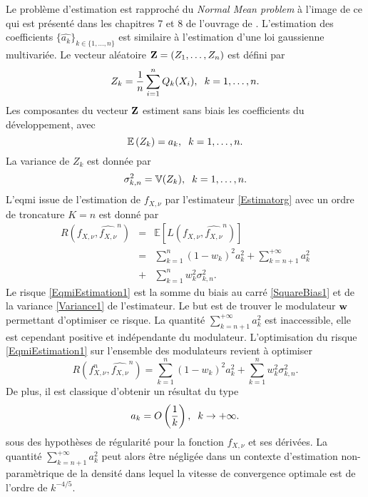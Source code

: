 Le problème d'estimation est rapproché du \textit{Normal Mean problem} à l'image de ce qui est présenté dans les chapitres 7 et 8 de l'ouvrage de \citet{Wa06}. L'estimation des coefficients $\{\widehat{a_{k}}\}_{k\in\{1,\ldots,n\}}$ est similaire à l'estimation d'une loi gaussienne multivariée. Le vecteur aléatoire $\bold{Z}=(Z_{1},\ldots,Z_{n})$ est défini par 
\begin{equation}\label{ZDefinition}
Z_{k}=\frac{1}{n}\sum_{i=1}^{n}Q_{k}(X_{i}),\hspace{0.2cm}k=1,\ldots,n.
\end{equation}
Les composantes du vecteur $\bold{Z}$ estiment sans biais les coefficients du développement, avec
\begin{equation}
\mathbb{E}\left(Z_{k}\right)=a_{k},\hspace{0.2cm}k=1,\ldots,n.
\end{equation}
La variance de $Z_{k}$ est donnée par
\begin{equation} 
\sigma_{k,n}^{2}=\mathbb{V}(Z_{k}),\hspace{0.2cm}k=1,\ldots,n.
\end{equation}
L\rq{}\gls{eqmi} issue de l'estimation de $f_{X,\nu}$ par l'estimateur \eqref{Estimatorg} avec un ordre de troncature $K=n$ est donné par
\begin{eqnarray}
R\left(f_{X,\nu},\widehat{f_{X,\nu}}^{n} \right)&=&\mathbb{E}\left[L\left(f_{X,\nu},\widehat{f_{X,\nu}}^{n}\right)\right]\label{EqmiEstimation1}\\
&=&\sum_{k=1}^{n}(1-w_{k})^{2}a_{k}^{2}+\sum_{k=n+1}^{+\infty}a_{k}^{2}\label{SquareBias1}\\
&+&\sum_{k=1}^{n}w_{k}^{2}\sigma_{k,n}^{2}\label{Variance1}. 
\end{eqnarray} 
Le risque \eqref{EqmiEstimation1} est la somme du biais au carré \eqref{SquareBias1} et de la variance \eqref{Variance1} de l'estimateur. Le but est de trouver le modulateur $\bold{w}$ permettant d\rq{}optimiser ce risque. La quantité $\sum_{k=n+1}^{+\infty}a_{k}^{2}$ est inaccessible, elle est cependant positive et indépendante du modulateur. L'optimisation du risque \eqref{EqmiEstimation1} sur l'ensemble des modulateurs revient à optimiser
\begin{equation}\label{ModifiedRisk}
R\left(f_{X,\nu}^{n},\widehat{f_{X,\nu}}^{n} \right)=\sum_{k=1}^{n}(1-w_{k})^{2}a_{k}^{2}+\sum_{k=1}^{n}w_{k}^{2}\sigma_{k,n}^{2}.
\end{equation}
De plus, il est classique d'obtenir un résultat du type 
\begin{equation*}
a_{k}=O\left(\frac{1}{k}\right),\hspace{0.2cm}k\rightarrow+\infty.
\end{equation*}
sous des hypothèses de régularité pour la fonction $f_{X,\nu}$ et ses dérivées. La quantité $\sum_{k=n+1}^{+\infty}a_{k}^{2}$ peut alors être négligée dans un contexte d'estimation non-paramètrique de la densité dans lequel la vitesse de convergence optimale est de l'ordre de $k^{-4/5}$.\\

